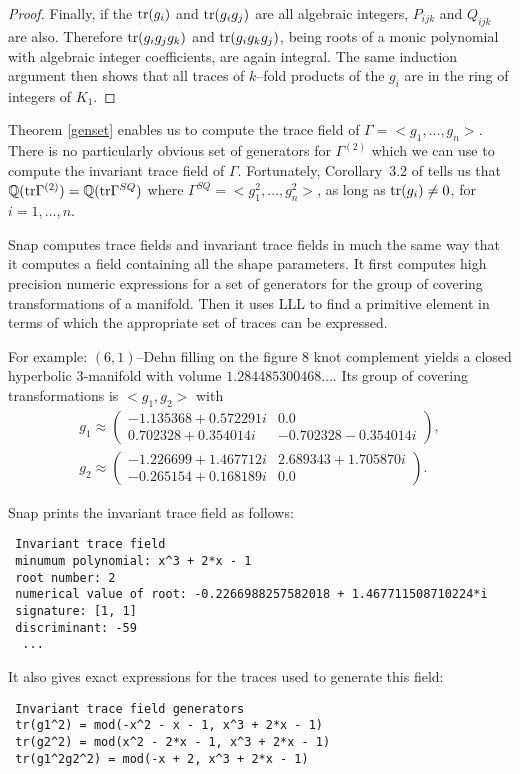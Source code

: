 \documentclass[a4paper]{amsart}
\def\Q{{\mathbb Q}}
\def\tr{\mbox{\rm tr}}
\theoremstyle{definition}
\begin{document}
\begin{proof}
Finally, if the $\tr(g_i)$ and $\tr(g_ig_j)$ are all algebraic
integers, $P_{ijk}$ and $Q_{ijk}$ are also. Therefore $\tr(g_i g_j
g_k)$ and $\tr(g_i g_k g_j)$, being roots of a monic polynomial with
algebraic integer coefficients, are again integral. The same induction 
argument then
shows that all traces of $k$--fold products of the $g_i$ 
are in the ring of integers of $K_1$.
\end{proof}

Theorem \ref{genset} enables us to compute the trace field of $\Gamma
= <\! g_1,\ldots,g_n\! >$. There is no particularly obvious set of
generators for $\Gamma^{(2)}$ which we can use to compute the
invariant trace field of $\Gamma$. Fortunately, Corollary~3.2 of
\cite{hlm} tells us that $\Q(\tr\Gamma^{(2)}) = \Q(\tr\Gamma^{SQ})$ where
$\Gamma^{SQ} = <\!  g_1^2,\ldots,g_n^2\! >$, as long as $\tr(g_i)\neq
0$, for $i=1,\ldots,n$.

Snap computes trace fields and invariant trace fields in much the same
way that it computes a field containing all the shape parameters. It
first computes high precision numeric expressions for a set of generators
for the group of covering transformations of a manifold. Then it uses
LLL to find a primitive element in terms of which the appropriate set
of traces can be expressed. 

For example: $(6,1)$--Dehn filling on the figure 8 knot complement
yields a closed hyperbolic 3-manifold with volume
$1.284485300468\ldots$. Its group of covering transformations is $<\!
g_1, g_2\!>$ with
\begin{gather*}
g_1 \approx 
\left( \begin{matrix}
-1.135368+0.572291 i & 0.0 \\
0.702328+0.354014 i & -0.702328-0.354014 i
\end{matrix}\right),\\
g_2\approx
\left( \begin{matrix}
-1.226699+1.467712 i & 2.689343+1.705870 i \\
-0.265154+0.168189 i & 0.0
\end{matrix}\right).
\end{gather*}

Snap prints the invariant trace field as follows:
\begin{verbatim}
 Invariant trace field
 minumum polynomial: x^3 + 2*x - 1
 root number: 2
 numerical value of root: -0.2266988257582018 + 1.467711508710224*i
 signature: [1, 1]
 discriminant: -59
  ...
\end{verbatim}
It also gives exact expressions for the traces used to generate this
field: 
\begin{verbatim}
 Invariant trace field generators
 tr(g1^2) = mod(-x^2 - x - 1, x^3 + 2*x - 1)
 tr(g2^2) = mod(x^2 - 2*x - 1, x^3 + 2*x - 1)
 tr(g1^2g2^2) = mod(-x + 2, x^3 + 2*x - 1)

\end{verbatim}
\end{document}
